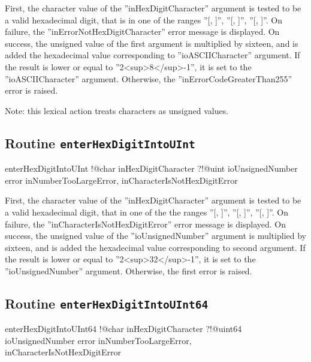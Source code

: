 First, the character value of the ''inHexDigitCharacter'' argument is tested to be a valid hexadecimal digit, that is in one of the ranges ''[\textquotesingle, \textquotesingle]'', ''[\textquotesingle, \textquotesingle]'', ''[\textquotesingle, \textquotesingle]''. On failure, the ''inErrorNotHexDigitCharacter'' error message is displayed. On success, the unsigned value of the first argument is multiplied by sixteen, and is added the hexadecimal value corresponding to ''ioASCIICharacter'' argument. If the result is lower or equal to ''2<sup>8</sup>-1'', it is set to the ''ioASCIICharacter'' argument. Otherwise, the ''inErrorCodeGreaterThan255'' error is raised.

Note: this lexical action treats characters as unsigned values.

\subsection{Routine \texttt{enterHexDigitIntoUInt}}

\begin{galgas}
enterHexDigitIntoUInt !@char inHexDigitCharacter
                      ?!@uint ioUnsignedNumber
                      error inNumberTooLargeError,
                            inCharacterIsNotHexDigitError
\end{galgas}

First, the character value of the ''inHexDigitCharacter'' argument is tested to be a valid hexadecimal digit, that in one of the the ranges ''[\textquotesingle, \textquotesingle]'', ''[\textquotesingle, \textquotesingle]'', ''[\textquotesingle, \textquotesingle]''. On failure, the ''inCharacterIsNotHexDigitError'' error message is displayed. On success, the unsigned value of the ''ioUnsignedNumber'' argument is multiplied by sixteen, and is added the hexadecimal value corresponding to second argument. If the result is lower or equal to ''2<sup>32</sup>-1'', it is set to the ''ioUnsignedNumber'' argument. Otherwise, the first error is raised.

\subsection{Routine \texttt{enterHexDigitIntoUInt64}}

\begin{galgas}
enterHexDigitIntoUInt64 !@char inHexDigitCharacter
                        ?!@uint64 ioUnsignedNumber
                        error inNumberTooLargeError,
                              inCharacterIsNotHexDigitError
\end{galgas}

